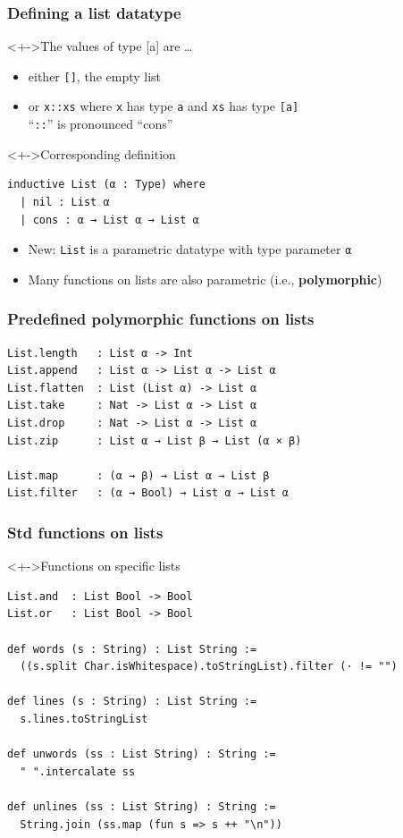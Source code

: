 \documentclass{beamer}
\begin{document}
\begin{frame}[fragile]
  \frametitle{Defining a list datatype}
    \begin{block}<+->{The values of type [a] are \dots}
    \begin{itemize}
    \item either \texttt{[]}, the empty list
    \item or \texttt{x::xs} where \texttt{x} has type \texttt{a} and
      \texttt{xs} has type \texttt{[a]} \\
      ``\texttt{::}'' is pronounced ``cons''
    \end{itemize}
  \end{block}
  \begin{block}<+->{Corresponding definition}
\begin{lstlisting}
inductive List (α : Type) where
  | nil : List α
  | cons : α → List α → List α
\end{lstlisting}
    \begin{itemize}
    \item New: \lstinline{List} is a parametric datatype with type
      parameter \lstinline{α}
    \item Many functions on lists are also parametric (i.e., \textbf{polymorphic}) 
  \end{itemize}
  \end{block}  
\end{frame}
\begin{frame}[fragile]
  \frametitle{Predefined polymorphic functions on lists}
\begin{lstlisting}
List.length   : List α -> Int
List.append   : List α -> List α -> List α
List.flatten  : List (List α) -> List α
List.take     : Nat -> List α -> List α
List.drop     : Nat -> List α -> List α
List.zip      : List α → List β → List (α × β)

List.map      : (α → β) → List α → List β 
List.filter   : (α → Bool) → List α → List α
\end{lstlisting}
\end{frame}
\begin{frame}[fragile]
  \frametitle{Std functions on lists}
  \begin{block}<+->{Functions on specific lists}
\begin{lstlisting}
List.and  : List Bool -> Bool
List.or   : List Bool -> Bool

def words (s : String) : List String :=
  ((s.split Char.isWhitespace).toStringList).filter (· != "")

def lines (s : String) : List String :=
  s.lines.toStringList

def unwords (ss : List String) : String :=
  " ".intercalate ss

def unlines (ss : List String) : String :=
  String.join (ss.map (fun s => s ++ "\n"))
\end{lstlisting}
  \end{block}
\end{frame}
\end{document}
